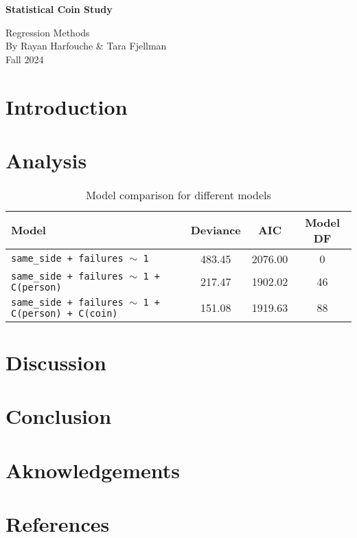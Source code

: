 \documentclass[a4paper, 12pt,oneside]{article}
\begin{document}
 
	\begin{center}
	    \Large
	    \textbf{Statistical Coin Study}
	        
	    \vspace{0.4cm}
	    \large
		Regression Methods \\
	    By Rayan Harfouche \& Tara Fjellman \\
	    \small{Fall 2024}
	\end{center}
	\section{Introduction}
	\section{Analysis}
	\begin{table}[htb]
		\caption{Model comparison for different models}
		\label{tab:model-comparison}
		\begin{tabular}{lccc}
		\toprule
		Model & Deviance & AIC & Model DF \\
		\midrule
		\texttt{same\_side + failures $\sim$ 1} & 483.45 & 2076.00 & 0 \\
		\texttt{same\_side + failures $\sim$ 1 + C(person)} & 217.47 & 1902.02 & 46 \\
		\texttt{same\_side + failures $\sim$ 1 + C(person) + C(coin)} & 151.08 & 1919.63 & 88 \\
		\bottomrule
		\end{tabular}
	\end{table}
	\section{Discussion}
	\section{Conclusion}
	\section*{Aknowledgements}
	\section*{References}
\end{document}
